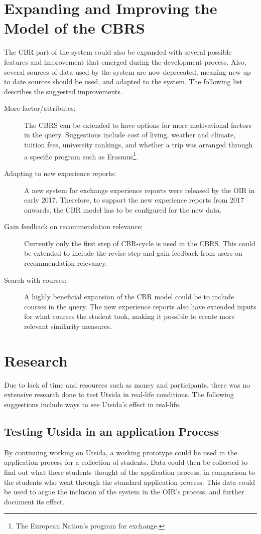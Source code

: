 \section{Expanding and Improving the Model of the CBRS}
The CBR part of the system could also be expanded with several possible features and improvement that emerged during the development process. Also, several sources of data used by the system are now deprecated, meaning new up to date sources should be used, and adapted to the system. The following list describes the suggested improvements.

\begin{description}
    \item[More factor/attributes:]  The CBRS can be extended to have options for more motivational factors in the query. Suggestions include cost of living, weather and climate, tuition fees,  university rankings, and whether a trip was arranged through a specific program such as Erasmus\footnote{The European Nation's program for exchange.}.
    \item[Adapting to new experience reports:] A new system for exchange experience reports were released by the OIR in early 2017. Therefore, to support the new experience reports from 2017 onwards, the CBR model has to be configured for the new data. 
    \item[Gain feedback on recommendation relevance:] Currently only the first step of CBR-cycle is used in the CBRS. This could be extended to include the revise step and gain feedback from users on recommendation relevancy.
    \item[Search with courses:] A highly beneficial expansion of the CBR model could be to include courses in the query. The new experience reports also have extended inputs for what courses the student took, making it possible to create more relevant similarity measures. 
\end{description}


\section{Research}
Due to lack of time and resources such as money and participants, there was no extensive research done to test Utsida in real-life conditions. The following suggestions include ways to see Utsida's effect in real-life.

\subsection{Testing Utsida in an application Process}
By continuing working on Utsida, a working prototype could be used in the application process for a collection of students. Data could then be collected to find out what these students thought of the application process, in comparison to the students who went through the standard application process. This data could be used to argue the inclusion of the system in the OIR's  process, and further document its effect.


